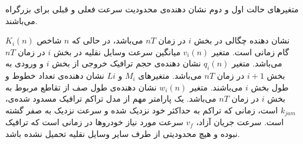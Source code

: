 متغیرهای حالت اول و دوم نشان دهنده‌ی محدودیت سرعت فعلی و قبلی برای بزرگراه می‌باشند.

$K_{i}(n)$ نشان دهنده چگالی در بخش $i$ در زمان $nT$ می‌باشد، در حالی که $n$ شاخص گام زمانی است.
متغیر $v_{i}(n)$ میانگین سرعت وسایل نقلیه در بخش $i$ در زمان $nT$ می‌باشد.
متغیر $q_{i}(n)$ نشان دهنده‌ی حجم ترافیک خروجی از بخش $i$ و ورودی به بخش $i+1$ در زمان $nT$ می‌باشد.
متغیرهای $M_{i}$ و $L{i}$ نشان دهنده‌ی تعداد خطوط و طول بخش $i$ می‌باشند.
متغیر $w_{i}(n)$ نشان دهنده‌ی طول صف از تقاطع مربوط به بخش $i$ در زمان $nT$ می‌باشد.
یک پارامتر مهم از مدل تراکم ترافیک مسدود شده‌ی، $k_{jam}$ است، زمانی که تراکم به حداکثر خود نزدیک شده و سرعت نزدیک به صفر گشته است.
سرعت جریان آزاد، $v_{f}$ سرعت مورد نیاز خودروها در زمانی است که ترافیک نبوده و هیچ محدودیتی از طرف سایر وسایل نقلیه تحمیل نشده باشد.






